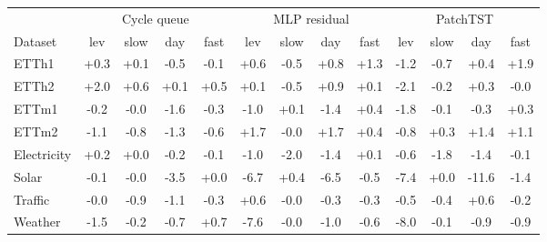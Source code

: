 \begin{tabular}{lcccccccccccc}
\toprule
& \multicolumn{4}{c}{Cycle queue} & \multicolumn{4}{c}{MLP residual} & \multicolumn{4}{c}{PatchTST} \\
\cmidrule(lr){2-5}\cmidrule(lr){6-9}\cmidrule(lr){10-13}
Dataset & lev & slow & day & fast & lev & slow & day & fast & lev & slow & day & fast \\
\midrule
ETTh1 & +0.3 & +0.1 & -0.5 & -0.1 & +0.6 & -0.5 & +0.8 & +1.3 & -1.2 & -0.7 & +0.4 & +1.9 \\
ETTh2 & +2.0 & +0.6 & +0.1 & +0.5 & +0.1 & -0.5 & +0.9 & +0.1 & -2.1 & -0.2 & +0.3 & -0.0 \\
ETTm1 & -0.2 & -0.0 & -1.6 & -0.3 & -1.0 & +0.1 & -1.4 & +0.4 & -1.8 & -0.1 & -0.3 & +0.3 \\
ETTm2 & -1.1 & -0.8 & -1.3 & -0.6 & +1.7 & -0.0 & +1.7 & +0.4 & -0.8 & +0.3 & +1.4 & +1.1 \\
Electricity & +0.2 & +0.0 & -0.2 & -0.1 & -1.0 & -2.0 & -1.4 & +0.1 & -0.6 & -1.8 & -1.4 & -0.1 \\
Solar & -0.1 & -0.0 & -3.5 & +0.0 & -6.7 & +0.4 & -6.5 & -0.5 & -7.4 & +0.0 & -11.6 & -1.4 \\
Traffic & -0.0 & -0.9 & -1.1 & -0.3 & +0.6 & -0.0 & -0.3 & -0.3 & -0.5 & -0.4 & +0.6 & -0.2 \\
Weather & -1.5 & -0.2 & -0.7 & +0.7 & -7.6 & -0.0 & -1.0 & -0.6 & -8.0 & -0.1 & -0.9 & -0.9 \\
\bottomrule
\end{tabular}